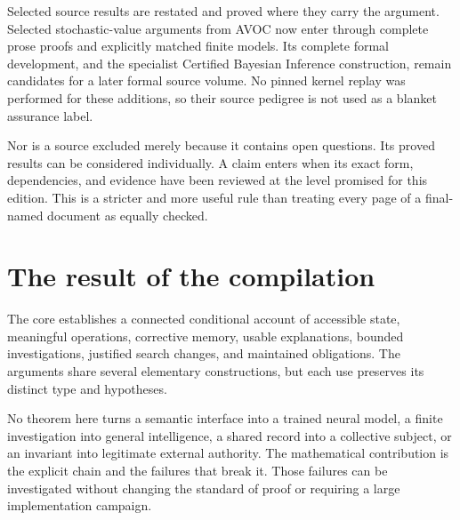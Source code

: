 \documentclass[11pt,oneside,openany]{book}
\theoremstyle{definition}\newtheorem{definition}[theorem]{Definition}
\begin{document}
Selected source results are restated and proved where they carry the argument. Selected stochastic-value arguments from AVOC now enter through complete prose proofs and explicitly matched finite models. Its complete formal development, and the specialist Certified Bayesian Inference construction, remain candidates for a later formal source volume. No pinned kernel replay was performed for these additions, so their source pedigree is not used as a blanket assurance label.

Nor is a source excluded merely because it contains open questions. Its proved results can be considered individually. A claim enters when its exact form, dependencies, and evidence have been reviewed at the level promised for this edition. This is a stricter and more useful rule than treating every page of a final-named document as equally checked.

\section{The result of the compilation}
The core establishes a connected conditional account of accessible state, meaningful operations, corrective memory, usable explanations, bounded investigations, justified search changes, and maintained obligations. The arguments share several elementary constructions, but each use preserves its distinct type and hypotheses.

No theorem here turns a semantic interface into a trained neural model, a finite investigation into general intelligence, a shared record into a collective subject, or an invariant into legitimate external authority. The mathematical contribution is the explicit chain and the failures that break it. Those failures can be investigated without changing the standard of proof or requiring a large implementation campaign.

\backmatter
\end{document}
